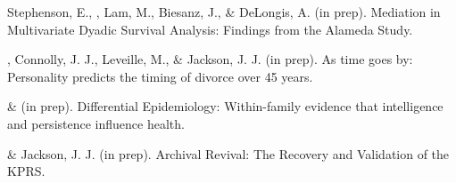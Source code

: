 \item Stephenson, E., \meb, Lam, M., Biesanz, J., \& DeLongis, A. (in prep). Mediation in Multivariate Dyadic Survival Analysis: Findings from the Alameda Study. %
\item\meb, Connolly, J. J., Leveille, M., \& Jackson, J. J. (in prep). As time goes by: Personality predicts the timing of divorce over 45 years. %
\item \meb \& \Joe (in prep). Differential Epidemiology: Within-family evidence that intelligence and persistence influence health.
\item \meb \& Jackson, J. J. (in prep). Archival Revival: The Recovery and Validation of the KPRS.
\vspace{-2mm}\begin{center}\end{center} \vspace{-4mm}